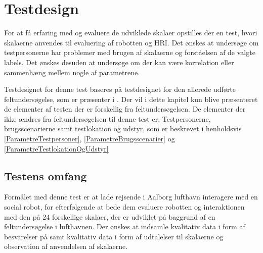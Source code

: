 \chapter{Testdesign}
\label{TestAfSkalaTestdesign}
%
For at få erfaring med og evaluere de udviklede skalaer opstilles der en test, hvori skalaerne anvendes til evaluering af robotten og HRI. \blankline
%
Det ønskes at undersøge om testpersonerne har problemer med brugen af skalaerne og forståelsen af de valgte labels. Det ønskes desuden at undersøge om der kan være korrelation eller sammenhæng mellem nogle af parametrene. \blankline

Testdesignet for denne test baseres på testdesignet for den allerede udførte feltundersøgelse, som er præsenter i . Der vil i dette kapitel kun blive præsenteret de elementer af testen der er forskellig fra feltundersøgelsen. De elementer der ikke ændres fra feltundersøgelsen til denne test er; Testpersonerne, brugsscenarierne samt testlokation og udstyr, som er beskrevet i henholdsvis \autoref{ParametreTestpersoner}, \autoref{ParametreBrugsscenarier} og \autoref{ParametreTestlokationOgUdstyr} 
%
\section{Testens omfang}
\label{TestAfSkalaTestensOmfang}
%
Formålet med denne test er at lade rejsende i Aalborg lufthavn interagere med en social robot, for efterfølgende at bede dem evaluere robotten og interaktionen med den på 24 forskellige skalaer, der er udviklet på baggrund af en feltundersøgelse i lufthavnen. Der ønskes at indsamle kvalitativ data i form af besvarelser på samt kvalitativ data i form af udtalelser til skalaerne og observation af anvendelsen af skalaerne. 